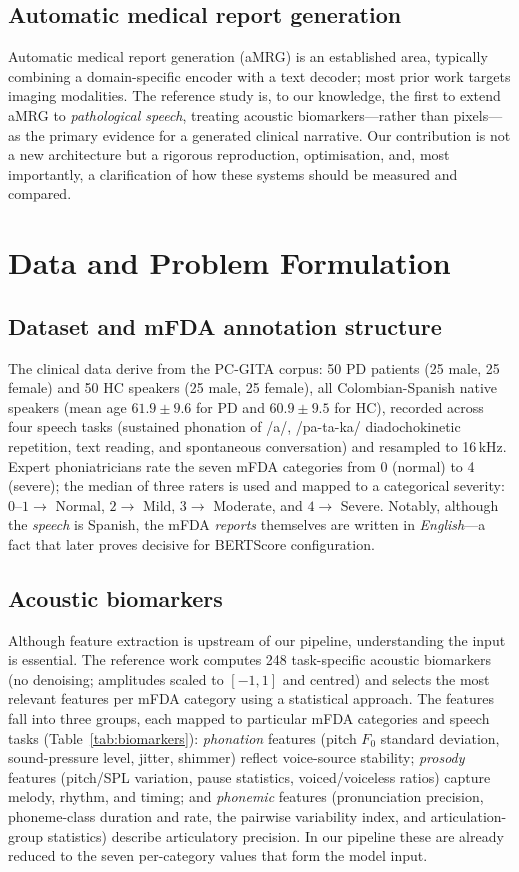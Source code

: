 \documentclass[11pt,twocolumn]{article}
\begin{document}
\subsection{Automatic medical report generation}
Automatic medical report generation (aMRG) is an established area, typically combining a
domain-specific encoder with a text decoder; most prior work targets imaging modalities. The
reference study is, to our knowledge, the first to extend aMRG to \emph{pathological speech},
treating acoustic biomarkers---rather than pixels---as the primary evidence for a generated
clinical narrative. Our contribution is not a new architecture but a rigorous reproduction,
optimisation, and, most importantly, a clarification of how these systems should be measured and
compared.

\section{Data and Problem Formulation}

\subsection{Dataset and mFDA annotation structure}
The clinical data derive from the PC-GITA corpus: 50 PD patients (25 male, 25 female) and 50 HC
speakers (25 male, 25 female), all Colombian-Spanish native speakers (mean age
$61.9\pm9.6$ for PD and $60.9\pm9.5$ for HC), recorded across four speech tasks (sustained
phonation of /a/, /pa-ta-ka/ diadochokinetic repetition, text reading, and spontaneous
conversation) and resampled to 16\,kHz. Expert phoniatricians rate the seven mFDA categories from
0 (normal) to 4 (severe); the median of three raters is used and mapped to a categorical
severity: $0$--$1\rightarrow$ Normal, $2\rightarrow$ Mild, $3\rightarrow$ Moderate, and
$4\rightarrow$ Severe. Notably, although the \emph{speech} is Spanish, the mFDA \emph{reports}
themselves are written in \emph{English}---a fact that later proves decisive for BERTScore
configuration.

\subsection{Acoustic biomarkers}
Although feature extraction is upstream of our pipeline, understanding the input is essential.
The reference work computes 248 task-specific acoustic biomarkers (no denoising; amplitudes
scaled to $[-1,1]$ and centred) and selects the most relevant features per mFDA category using a
statistical approach. The features fall into three groups, each mapped to particular mFDA
categories and speech tasks (Table~\ref{tab:biomarkers}): \emph{phonation} features (pitch $F_0$
standard deviation, sound-pressure level, jitter, shimmer) reflect voice-source stability;
\emph{prosody} features (pitch/SPL variation, pause statistics, voiced/voiceless ratios) capture
melody, rhythm, and timing; and \emph{phonemic} features (pronunciation precision, phoneme-class
duration and rate, the pairwise variability index, and articulation-group statistics) describe
articulatory precision. In our pipeline these are already reduced to the seven per-category
values that form the model input.
\end{document}

